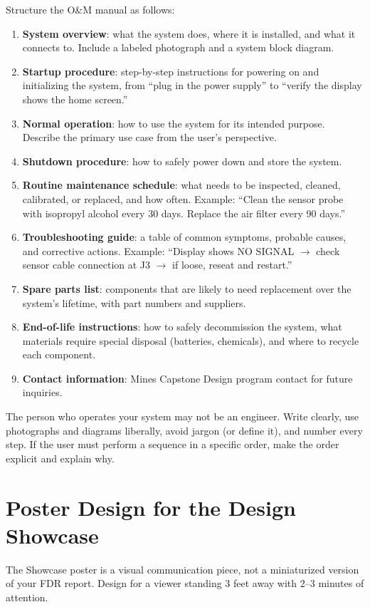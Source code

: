 Structure the O\&M manual as follows:
\begin{enumerate}[nosep,leftmargin=1.5em]
\item \textbf{System overview}: what the system does, where it is installed, and what it connects to. Include a labeled photograph and a system block diagram.
\item \textbf{Startup procedure}: step-by-step instructions for powering on and initializing the system, from ``plug in the power supply'' to ``verify the display shows the home screen.''
\item \textbf{Normal operation}: how to use the system for its intended purpose. Describe the primary use case from the user's perspective.
\item \textbf{Shutdown procedure}: how to safely power down and store the system.
\item \textbf{Routine maintenance schedule}: what needs to be inspected, cleaned, calibrated, or replaced, and how often. Example: ``Clean the sensor probe with isopropyl alcohol every 30 days. Replace the air filter every 90 days.''
\item \textbf{Troubleshooting guide}: a table of common symptoms, probable causes, and corrective actions. Example: ``Display shows NO SIGNAL $\to$ check sensor cable connection at J3 $\to$ if loose, reseat and restart.''
\item \textbf{Spare parts list}: components that are likely to need replacement over the system's lifetime, with part numbers and suppliers.
\item \textbf{End-of-life instructions}: how to safely decommission the system, what materials require special disposal (batteries, chemicals), and where to recycle each component.
\item \textbf{Contact information}: Mines Capstone Design program contact for future inquiries.
\end{enumerate}

\begin{tipbox}
The person who operates your system may not be an engineer. Write clearly, use photographs and diagrams liberally, avoid jargon (or define it), and number every step. If the user must perform a sequence in a specific order, make the order explicit and explain why.
\end{tipbox}

\section{Poster Design for the Design Showcase}
The Showcase poster is a visual communication piece, not a miniaturized version of your FDR report. Design for a viewer standing 3 feet away with 2--3 minutes of attention.

